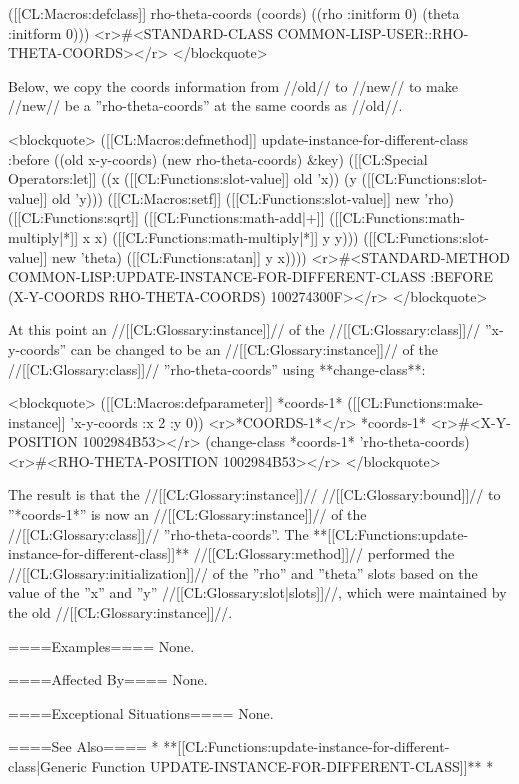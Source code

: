 ([[CL:Macros:defclass]] rho-theta-coords (coords) 
  ((rho :initform 0) 
   (theta :initform 0)))
<r>#<STANDARD-CLASS COMMON-LISP-USER::RHO-THETA-COORDS></r>
</blockquote>

Below, we copy the coords information from //old// to //new// to make //new// be a ''rho-theta-coords'' at the same coords as //old//. 

<blockquote>
([[CL:Macros:defmethod]] update-instance-for-different-class :before 
    ((old x-y-coords) (new rho-theta-coords) &key) 
  ([[CL:Special Operators:let]] ((x ([[CL:Functions:slot-value]] old 'x)) 
        (y ([[CL:Functions:slot-value]] old 'y)))
    ([[CL:Macros:setf]] ([[CL:Functions:slot-value]] new 'rho) ([[CL:Functions:sqrt]] ([[CL:Functions:math-add|+]] ([[CL:Functions:math-multiply|*]] x x) ([[CL:Functions:math-multiply|*]] y y))) 
          ([[CL:Functions:slot-value]] new 'theta) ([[CL:Functions:atan]] y x))))
<r>#<STANDARD-METHOD COMMON-LISP:UPDATE-INSTANCE-FOR-DIFFERENT-CLASS 
                     :BEFORE (X-Y-COORDS RHO-THETA-COORDS) {100274300F}></r>
</blockquote>

At this point an //[[CL:Glossary:instance]]// of the //[[CL:Glossary:class]]// ''x-y-coords'' can be changed to be an //[[CL:Glossary:instance]]// of the //[[CL:Glossary:class]]// ''rho-theta-coords'' using **change-class**:

<blockquote>
([[CL:Macros:defparameter]] *coords-1* ([[CL:Functions:make-instance]] 'x-y-coords :x 2 :y 0)) <r>*COORDS-1*</r>
*coords-1* <r>#<X-Y-POSITION {1002984B53}></r>
(change-class *coords-1* 'rho-theta-coords) <r>#<RHO-THETA-POSITION {1002984B53}></r>
</blockquote>

The result is that the //[[CL:Glossary:instance]]// //[[CL:Glossary:bound]]// to ''*coords-1*'' is now an //[[CL:Glossary:instance]]// of the //[[CL:Glossary:class]]// ''rho-theta-coords''. The **[[CL:Functions:update-instance-for-different-class]]** //[[CL:Glossary:method]]// performed the //[[CL:Glossary:initialization]]// of the ''rho'' and ''theta'' slots based on the value of the ''x'' and ''y'' //[[CL:Glossary:slot|slots]]//, which were maintained by the old //[[CL:Glossary:instance]]//.

====Examples====
None.

====Affected By====
None.

====Exceptional Situations====
None.

====See Also====
  * **[[CL:Functions:update-instance-for-different-class|Generic Function UPDATE-INSTANCE-FOR-DIFFERENT-CLASS]]**
  * {\secref\ChangingInstanceClass}

